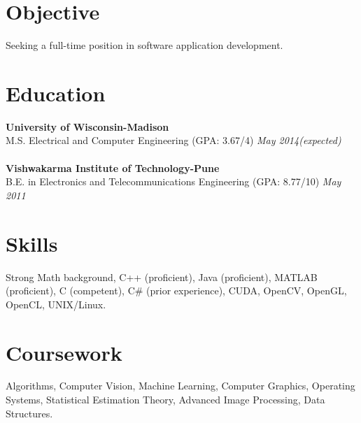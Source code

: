 \documentclass[margin]{res}
\begin{document}
 

 

\address{thite@wisc.edu\\www.linkedin.com/in/aashishthite\\https://github.com/aashishthite‎}
\address{\hfill 2110 University Avenue, Apt. 104, \\ \hfill Madison, WI-53726, USA.\\ \hfill (408) 601-9349}

 
\begin{resume} 
 
\section{Objective} 
Seeking a full-time position in software application development.%

\section{Education} 
{\bf University of Wisconsin-Madison} \\
M.S. Electrical and Computer Engineering (GPA: 3.67/4) \hfill {\it May 2014(expected)} \\
\\
{\bf Vishwakarma Institute of Technology-Pune} \\
B.E. in Electronics and Telecommunications Engineering (GPA: 8.77/10) \hfill {\it May 2011}

\section{Skills}
Strong Math background, C++ (proficient), Java (proficient), MATLAB (proficient), C (competent), C\# (prior experience), CUDA, OpenCV, OpenGL, OpenCL, UNIX/Linux.

\section{Coursework}
Algorithms, Computer Vision, Machine Learning, Computer Graphics, Operating Systems, Statistical Estimation Theory, Advanced Image Processing, Data Structures.


\end{resume}
\end{document}
